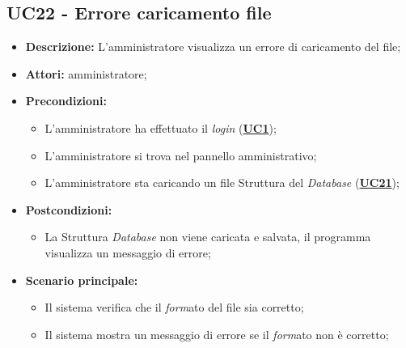 \subsection{UC22 - Errore caricamento file}
\label{sec:UC22}
\begin{itemize}
	\item \textbf{Descrizione:} L’amministratore visualizza un errore di caricamento del file;
	\item \textbf{Attori:} amministratore;
	\item \textbf{Precondizioni:} 
	\begin{itemize}
		\item L’amministratore ha effettuato il \textit{login} (\hyperref[sec:UC1]{\textbf{UC1}});
		\item L’amministratore si trova nel pannello amministrativo;
		\item L’amministratore sta caricando un file Struttura del \textit{Database} (\hyperref[sec:UC21]{\textbf{UC21}});
	\end{itemize}
	\item \textbf{Postcondizioni:} 
	\begin{itemize}
		\item La Struttura \textit{Database} non viene caricata e salvata, il programma visualizza un messaggio di errore;
	\end{itemize}
	\item \textbf{Scenario principale:} 
	\begin{itemize}
		\item Il sistema verifica che il \textit{form}ato del file sia corretto;
		\item Il sistema mostra un messaggio di errore se il \textit{form}ato non è corretto;
	\end{itemize}
\end{itemize}



